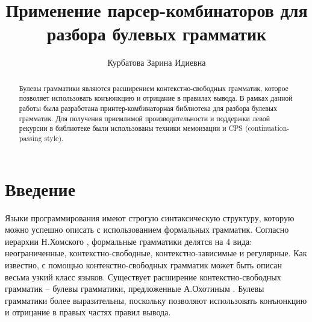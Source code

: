\title{Применение парсер-комбинаторов для разбора булевых грамматик}


\author{Курбатова Зарина Идиевна}



\maketitle

\begin{abstract}
  Булевы грамматики являются расширением контекстно-свободных грамматик, которое позволяет
  использовать конъюнкцию и отрицание в правилах вывода. В рамках данной работы была
  разработана принтер-комбинаторная библиотека для разбора булевых грамматик. Для
  получения приемлимой производительности и поддержки левой рекурсии в библиотеке были
  использованы техники мемоизации и CPS (continuation-passing style).
\end{abstract}

\section*{Введение} 
Языки программирования имеют строгую синтаксическую структуру, которую можно успешно описать с использованием формальных грамматик. Согласно иерархии Н.Хомского \cite{chomsky1956three}, формальные грамматики делятся на 4 вида:  неограниченные, контекстно-свободные, контекстно-зависимые и регулярные. Как известно, с помощью контекстно-свободных грамматик может быть описан весьма узкий класс языков. Существует расширение контекстно-свободных грамматик -- булевы грамматики, предложенные А.Охотиным \cite{okhotin2004boolean}. Булевы грамматики более выразительны, поскольку позволяют использовать конъюнкцию и отрицание в правых частях правил вывода.


